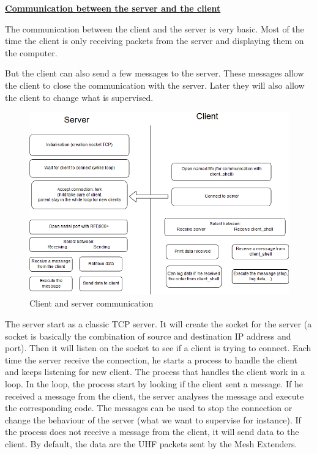 \hfill \break \underline{\large{\textbf{Communication between the server and the client}}}

The communication between the client and the server is very basic. Most of the time the client is only receiving packets from the server and displaying them on the computer.

But the client can also send a few messages to the server. These messages allow the client to close the communication with the server. Later they will also allow the client to change what is supervised.

\begin{figure}[H]
\begin{center}
\includegraphics[width=\textwidth]{image/clientServer.png}%
\caption{Client and server communication}%
\label{figure:CS}%
\end{center}
\end{figure}

The server start as a classic TCP server. It will create the socket for the server (a socket is basically the combination of source and destination IP address and port). Then it will listen on the socket to see if a client is trying to connect. Each time the server receive the connection, he starts a process to handle the client and keeps listening for new client. The process that handles the client work in a loop. In the loop, the process start by looking if the client sent a message. If he received a message from the client, the server analyses the message and execute the corresponding code. The messages can be used to stop the connection or change the behaviour of the server (what we want to supervise for instance). If the process does not receive a message from the client, it will send data to the client. By default, the data are the UHF packets sent by the Mesh Extenders.


